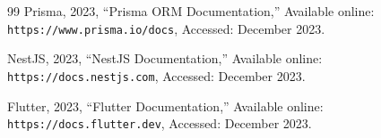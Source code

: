 \documentclass[12pt,a4paper]{report}
\begin{document}
\begin{thebibliography}{99}
Prisma, 2023, ``Prisma ORM Documentation,'' Available online:
\texttt{https://www.prisma.io/docs}, Accessed: December 2023.

NestJS, 2023, ``NestJS Documentation,'' Available online: \texttt{https://docs.nestjs.com},
Accessed: December 2023.

Flutter, 2023, ``Flutter Documentation,'' Available online: \texttt{https://docs.flutter.dev},
Accessed: December 2023.

\end{thebibliography}
\endgroup
\end{document}
